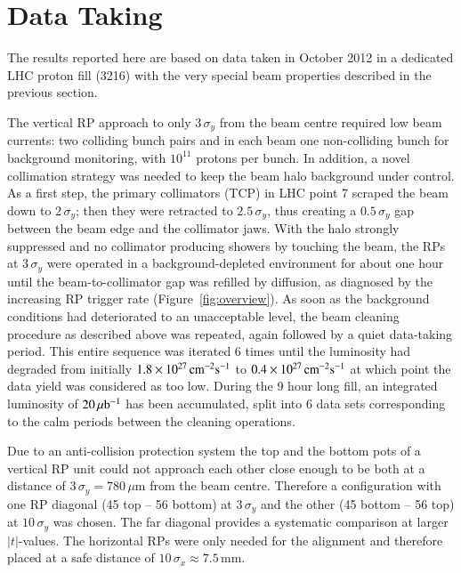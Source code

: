 \section{Data Taking}
\label{sec:data taking}

The results reported here are based on data taken in October 2012 
in a dedicated LHC proton fill (3216)
with the very special beam properties described in the previous section.

The vertical RP approach to only $3\,\sigma_{y}$ from the beam centre required low beam currents: two colliding bunch pairs and in each beam one 
non-colliding bunch for background monitoring, with $10^{11}$ protons per bunch. In addition, a novel collimation strategy was needed to keep the beam halo background under control. As a first step, the primary 
collimators (TCP) in LHC point 7 scraped the beam down to $2\,\sigma_{y}$; then 
they were retracted to $2.5\,\sigma_{y}$, thus creating a $0.5\,\sigma_{y}$ gap 
between
the beam edge and the collimator jaws. With the halo strongly suppressed 
and no collimator producing showers by touching the beam, the RPs at 
$3\,\sigma_{y}$ were operated in a background-depleted environment for about one 
hour until the beam-to-collimator gap was refilled by diffusion, as 
diagnosed by the increasing RP trigger rate (Figure~\ref{fig:overview}). As soon as the background conditions
had deteriorated to an unacceptable level, the beam cleaning procedure as described above was repeated, again followed by a quiet data-taking period.
This entire sequence was iterated 6 times until the luminosity had degraded 
from initially $1.8\times10^{27}\,\rm cm^{-2}s^{-1}$ to 
$0.4\times10^{27}\,\rm cm^{-2}s^{-1}$ %
at which point the data yield was considered as too low. 
During the 9 hour long fill, an integrated luminosity of $20\,\rm \mu b^{-1}$ 
has been accumulated, split into 6 data sets corresponding to the calm periods 
between the cleaning operations. 

Due to an anti-collision protection system the top and the bottom pots of a 
vertical RP unit could not approach each other close enough to be both at a 
distance of $3\,\sigma_{y} = 780\,\mu$m from the beam centre. Therefore a 
configuration with one RP diagonal (45 top -- 56 bottom) at $3\,\sigma_{y}$ and the other (45 bottom -- 56 top) at 
$10\,\sigma_{y}$ was chosen. The far diagonal provides a systematic comparison
at larger $|t|$-values.
The horizontal RPs were only needed for the alignment and therefore placed at a
safe distance of $10\,\sigma_{x} \approx 7.5$\,mm.

